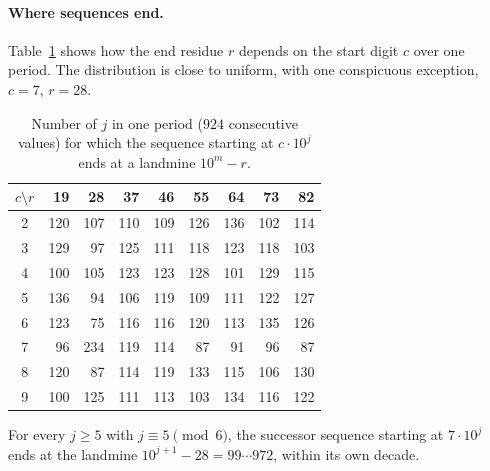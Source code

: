 \paragraph{Where sequences end.}
Table~\ref{tab:cr} shows how the end residue $r$ depends on the start digit $c$ over one period.
The distribution is close to uniform, with one conspicuous exception, $c = 7$, $r = 28$.

\begin{table}[ht]
  \centering
  \begin{tabular}{@{}c*{8}{r}@{}}
    \toprule
    $c \setminus r$ & 19 & 28 & 37 & 46 & 55 & 64 & 73 & 82 \\
    \midrule
    2 & 120 & 107 & 110 & 109 & 126 & 136 & 102 & 114 \\
    3 & 129 &  97 & 125 & 111 & 118 & 123 & 118 & 103 \\
    4 & 100 & 105 & 123 & 123 & 128 & 101 & 129 & 115 \\
    5 & 136 &  94 & 106 & 119 & 109 & 111 & 122 & 127 \\
    6 & 123 &  75 & 116 & 116 & 120 & 113 & 135 & 126 \\
    7 &  96 & 234 & 119 & 114 &  87 &  91 &  96 &  87 \\
    8 & 120 &  87 & 114 & 119 & 133 & 115 & 106 & 130 \\
    9 & 100 & 125 & 111 & 113 & 103 & 134 & 116 & 122 \\
    \bottomrule
  \end{tabular}
  \caption{Number of $j$ in one period ($924$ consecutive values) for which the sequence starting at
  $c \cdot 10^j$ ends at a landmine $10^m - r$.}
  \label{tab:cr}
\end{table}

\begin{proposition}
  \label{prop:seven}
  For every $j \ge 5$ with $j \equiv 5 \pmod 6$, the successor sequence starting at $7 \cdot 10^j$
  ends at the landmine $10^{j+1} - 28 = 99\cdots972$, within its own decade.
\end{proposition}

